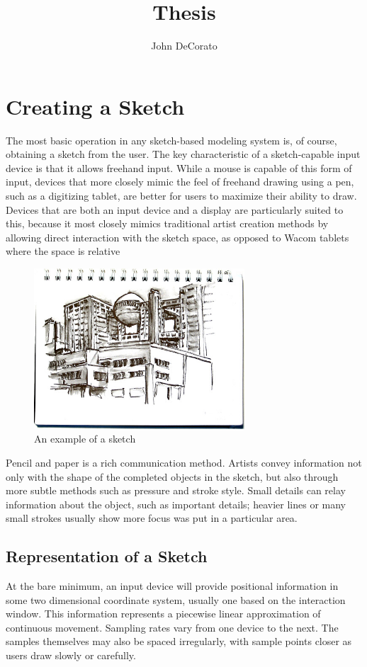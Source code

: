 \documentclass[12pt]{report}
\title{Thesis}
\author{John DeCorato}
\date{ }
\begin{document}
\chapter{Creating a Sketch}

The most basic operation in any sketch-based modeling system is, of course, obtaining a sketch from the user.
The key characteristic of a sketch-capable input device is that it allows freehand input.
While a mouse is capable of this form of input, devices that more closely mimic the feel of freehand drawing using a pen, such as a digitizing tablet, are better for users to maximize their ability to draw.
Devices that are both an input device and a display are particularly suited to this, because it most closely mimics traditional artist creation methods by allowing direct interaction with the sketch space, as opposed to Wacom tablets where the space is relative

\begin{figure}
\includegraphics[width=0.7\textwidth]{fujitv}
\caption{An example of a sketch}
\end{figure}

Pencil and paper is a rich communication method. 
Artists convey information not only with the shape of the completed objects in the sketch, but also through more subtle methods such as pressure and stroke style.
Small details can relay information about the object, such as important details; heavier lines or many small strokes usually show more focus was put in a particular area.

\section{Representation of a Sketch}

At the bare minimum, an input device will provide positional information in some two dimensional coordinate system, usually one based on the interaction window.
This information represents a piecewise linear approximation of continuous movement.
Sampling rates vary from one device to the next.
The samples themselves may also be spaced irregularly, with sample points closer as users draw slowly or carefully.
\end{document}

